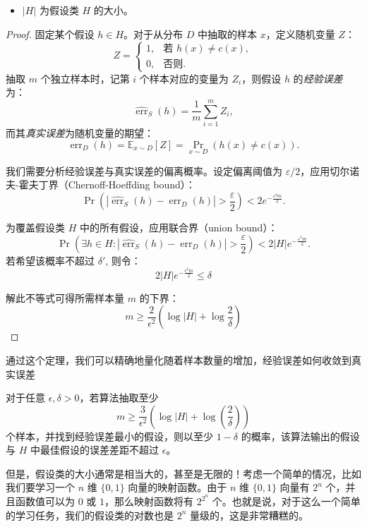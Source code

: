 \documentclass[lang=cn,newtx,10pt,scheme=chinese,chinesefont=nofont,citestyle=gb7714-2015, bibstyle=gb7714-2015]{elegantbook}
\begin{document}
\begin{refsection}
\begin{theorem}[有限假设类的泛化误差界]
\begin{itemize}
    \item \( |H| \) 为假设类 \( H \) 的大小。
\end{itemize}
\end{theorem}
\begin{proof}
固定某个假设 \( h \in H \)。对于从分布 \( D \) 中抽取的样本 \( x \)，定义随机变量 \( Z \)：
\[
Z = \begin{cases}
1, & \text{若 } h(x) \neq c(x), \\
0, & \text{否则}.
\end{cases}
\]
抽取 \( m \) 个独立样本时，记第 \( i \) 个样本对应的变量为 \( Z_i \)，则假设 \( h \) 的\emph{经验误差}为：
\[
\widehat{\operatorname{err}}_S(h) = \frac{1}{m} \sum_{i=1}^m Z_i,
\]
而其\emph{真实误差}为随机变量的期望：
\[
\operatorname{err}_D(h) = \mathbb{E}_{x \sim D}[Z] = \Pr_{x \sim D}(h(x) \neq c(x)).
\]

我们需要分析经验误差与真实误差的偏离概率。设定偏离阈值为 \( \varepsilon/2 \)，应用切尔诺夫-霍夫丁界（Chernoff-Hoeffding bound）：
\[
\Pr\left( \left| \widehat{\operatorname{err}}_S(h) - \operatorname{err}_D(h) \right| > \frac{\varepsilon}{2} \right) < 2e^{-\frac{\varepsilon^2 m}{2}}.
\]

为覆盖假设类 \( H \) 中的所有假设，应用联合界（union bound）：
\[
\Pr\left( \exists h \in H : \left| \widehat{\operatorname{err}}_S(h) - \operatorname{err}_D(h) \right| > \frac{\varepsilon}{2} \right) < 2|H|e^{-\frac{\varepsilon^2 m}{2}}.
\]
若希望该概率不超过 \(\delta'\), 则令：
\[
2|H|e^{-\frac{\epsilon^2 m}{2}} \leq \delta
\]

解此不等式可得所需样本量 \(m\) 的下界：
\[
m \geq \frac{2}{\epsilon^2} \left( \log |H| + \log \frac{2}{\delta} \right)
\]

\end{proof}
通过这个定理，我们可以精确地量化随着样本数量的增加，经验误差如何收敛到真实误差
\begin{corollary}
    对于任意 $\epsilon, \delta > 0$，若算法抽取至少 
\[
m \geq \frac{3}{\epsilon^2} \left( \log |H| + \log \left( \frac{2}{\delta} \right) \right)
\] 
个样本，并找到经验误差最小的假设，则以至少 $1 - \delta$ 的概率，该算法输出的假设与 $H$ 中最佳假设的误差差距不超过 $\epsilon$。
\end{corollary}

但是，假设类的大小通常是相当大的，甚至是无限的！考虑一个简单的情况，比如我们要学习一个 $n$ 维 $\{0,1\}$ 向量的映射函数。由于 $n$ 维 $\{0,1\}$ 向量有 $2^n$ 个，并且函数值可以为 $0$ 或 $1$，那么映射函数将有 $2^{2^n}$ 个。也就是说，对于这么一个简单的学习任务，我们的假设类的对数也是 $2^n$ 量级的，这是非常糟糕的。

\end{refsection}
\end{document}
